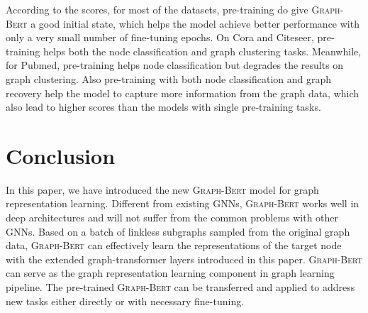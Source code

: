 \documentclass{article}
\newcommand{\our}{\textsc{Graph-Bert}}
\begin{document}
According to the scores, for most of the datasets, pre-training do give {\our} a good initial state, which helps the model achieve better performance with only a very small number of fine-tuning epochs. On Cora and Citeseer, pre-training helps both the node classification and graph clustering tasks. Meanwhile, for Pubmed, pre-training helps node classification but degrades the results on graph clustering. Also pre-training with both node classification and graph recovery help the model to capture more information from the graph data, which also lead to higher scores than the models with single pre-training tasks.

















\section{Conclusion}\label{sec:conclusion}

In this paper, we have introduced the new {\our} model for graph representation learning. Different from existing GNNs, {\our} works well in deep architectures and will not suffer from the common problems with other GNNs. Based on a batch of linkless subgraphs sampled from the original graph data, {\our} can effectively learn the representations of the target node with the extended graph-transformer layers introduced in this paper. {\our} can serve as the graph representation learning component in graph learning pipeline. The pre-trained {\our} can be transferred and applied to address new tasks either directly or with necessary fine-tuning.







{


}
\end{document}
